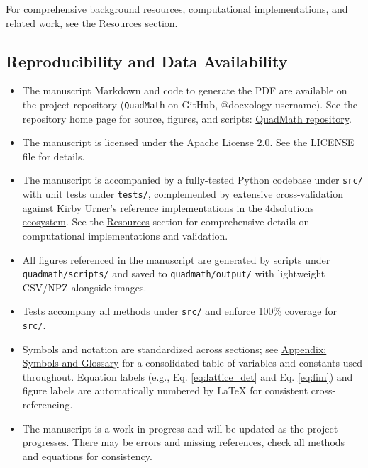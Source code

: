 \documentclass[
  10pt,
]{article}
\newcommand{\passthrough}[1]{#1}
\providecommand{\tightlist}{%
  \setlength{\itemsep}{0pt}\setlength{\parskip}{0pt}}
\begin{document}
For comprehensive background resources, computational implementations,
and related work, see the \href{07_resources.md}{Resources} section.

\hypertarget{reproducibility-and-data-availability}{%
\subsection{Reproducibility and Data
Availability}\label{reproducibility-and-data-availability}}

\begin{itemize}
\tightlist
\item
  The manuscript Markdown and code to generate the PDF are available on
  the project repository (\passthrough{\lstinline!QuadMath!} on GitHub,
  @docxology username). See the repository home page for source,
  figures, and scripts:
  \href{https://github.com/docxology/quadmath}{QuadMath repository}.
\item
  The manuscript is licensed under the Apache License 2.0. See the
  \href{../LICENSE}{LICENSE} file for details.
\item
  The manuscript is accompanied by a fully-tested Python codebase under
  \passthrough{\lstinline!src/!} with unit tests under
  \passthrough{\lstinline!tests/!}, complemented by extensive
  cross-validation against Kirby Urner's reference implementations in
  the \href{https://github.com/4dsolutions}{4dsolutions ecosystem}. See
  the \href{07_resources.md}{Resources} section for comprehensive
  details on computational implementations and validation.
\item
  All figures referenced in the manuscript are generated by scripts
  under \passthrough{\lstinline!quadmath/scripts/!} and saved to
  \passthrough{\lstinline!quadmath/output/!} with lightweight CSV/NPZ
  alongside images.
\item
  Tests accompany all methods under \passthrough{\lstinline!src/!} and
  enforce 100\% coverage for \passthrough{\lstinline!src/!}.
\item
  Symbols and notation are standardized across sections; see
  \href{10_symbols_glossary.md}{Appendix: Symbols and Glossary} for a
  consolidated table of variables and constants used throughout.
  Equation labels (e.g., Eq. \eqref{eq:lattice_det} and Eq.
  \eqref{eq:fim}) and figure labels are automatically numbered by LaTeX
  for consistent cross-referencing.
\item
  The manuscript is a work in progress and will be updated as the
  project progresses. There may be errors and missing references, check
  all methods and equations for consistency.
\end{itemize}
\end{document}

